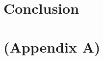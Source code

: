 \documentclass[12pt]{report}
\begin{document}
    \chapter{Conclusion}
    
    
    \printbibliography

    \appendix
    \chapter{(Appendix A)}
    
    


\end{document}
